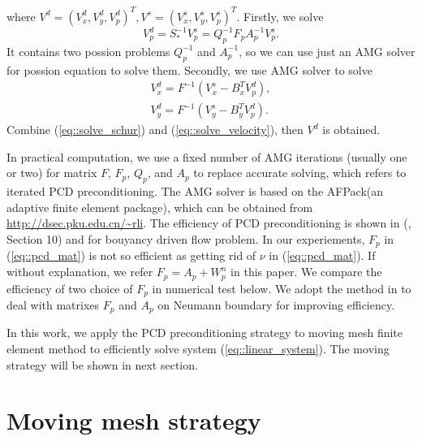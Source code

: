 \documentclass{eajam}
\begin{document}
  where $V^d = (V_x^d, V_y^d, V_p^d)^T, V^s = (V_x^s, V_y^s, V_p^s)^T$.
  Firstly, we solve 
  \begin{equation}
    V_p^d = S_*^{-1} V_p^s = Q_p^{-1} F_p A_p^{-1} V_p^s.
    \label{eq::solve_schur}
  \end{equation}
  It contains two possion problems $Q_p^{-1}$ and $A_p^{-1}$, so we can
  use just an AMG solver for possion equation to solve them.
  Secondly, we use AMG solver to solve 
  \begin{equation}
    \begin{aligned}
      V_x^d = F^{-1} (V_x^s - B_x^T V_p^d), \\
      V_y^d = F^{-1} (V_y^s - B_y^T V_p^d).
    \end{aligned}
    \label{eq::solve_velocity}
  \end{equation}
  Combine (\ref{eq::solve_schur}) and (\ref{eq::solve_velocity}), then
  $V^d$ is obtained.

  In practical computation, we use a fixed number of AMG iterations
  (usually one or two) for matrix $F$, $F_p$, $Q_p$, and $A_p$ to
  replace accurate solving, which refers to iterated PCD
  preconditioning. The AMG solver is based on the AFPack(an adaptive
  finite element package), which can be
  obtained from \url{http://dsec.pku.edu.cn/~rli}. The efficiency of
  PCD preconditioning is shown in (\cite{elman2005finite},
  Section 10) and \cite{elman2011fast} for bouyancy driven flow
  problem. In our experiements, $F_p$ in (\ref{eq::pcd_mat}) is not so
  efficient as getting rid of $\nu$ in (\ref{eq::pcd_mat}). If without
  explanation, we refer $F_p = A_p + W_p^n$ in this paper. We compare
  the efficiency of two choice of $F_p$ in numerical test below. We
  adopt the method in \cite{elman2009boundary} to deal with matrixes
  $F_p$ and $A_p$ on Neumann boundary for improving efficiency.
  
  In this work, we apply the PCD preconditioning strategy to moving mesh
  finite element method to efficiently solve system
  (\ref{eq::linear_system}). The moving strategy will be shown in next
  section.
 
\section{Moving mesh strategy}
\end{document}
